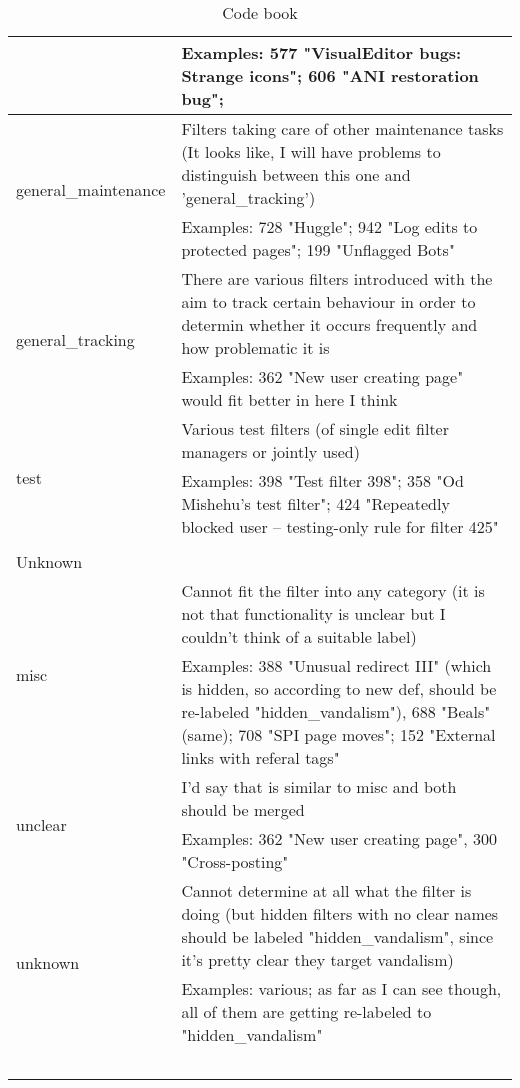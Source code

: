 \begin{longtable}{ | p{5cm} | p{9cm} | }
                                     & Examples: 577 "VisualEditor bugs: Strange icons"; 606 "ANI restoration bug";\\
    \hline
    \multirow{2}{*}{general\_maintenance} & Filters taking care of other maintenance tasks (It looks like, I will have problems to distinguish between this one and 'general\_tracking')\\
                                     & Examples: 728 "Huggle"; 942 "Log edits to protected pages"; 199 "Unflagged Bots"\\
    \hline
    \multirow{2}{*}{general\_tracking} & There are various filters introduced with the aim to track certain behaviour in order to determin whether it occurs frequently and how problematic it is\\
                                     & Examples: 362 "New user creating page" would fit better in here I think\\
    \hline
    \multirow{2}{*}{test} & Various test filters (of single edit filter managers or jointly used)\\
                                     & Examples: 398 "Test filter 398"; 358 "Od Mishehu's test filter"; 424 "Repeatedly blocked user --  testing-only rule for filter 425"\\
    \hline
        \multicolumn{2}{|l|}{} \\
    \hline
        \multicolumn{2}{|l|}{Unknown} \\
    \hline
    \multirow{2}{*}{misc} & Cannot fit the filter into any category (it is not that functionality is unclear but I couldn't think of a suitable label)\\
                                     & Examples: 388 "Unusual redirect III" (which is hidden, so according to new def, should be re-labeled "hidden\_vandalism"), 688 "Beals" (same); 708 "SPI page moves"; 152 "External links with referal tags"\\
    \hline
    \multirow{2}{*}{unclear} & I'd say that is similar to misc and both should be merged\\
                                     & Examples: 362 "New user creating page", 300 "Cross-posting"\\
    \hline
    \multirow{2}{*}{unknown} & Cannot determine at all what the filter is doing (but hidden filters with no clear names should be labeled "hidden\_vandalism", since it's pretty clear they target vandalism)\\
                                     & Examples: various; as far as I can see though, all of them are getting re-labeled to "hidden\_vandalism"\\
    \hline
    \caption{Code book}~\label{table:code-book}
\end{longtable}


